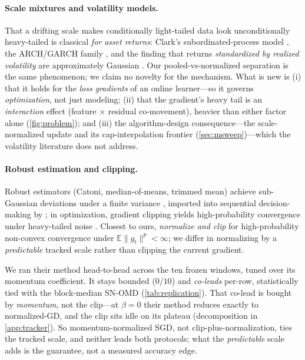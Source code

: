 \documentclass{article}
\newcommand{\norm}[1]{\lVert #1 \rVert}
\newcommand{\gt}{g_t}
\begin{document}
\paragraph{Scale mixtures and volatility models.} That a drifting scale makes
conditionally light-tailed data look unconditionally heavy-tailed is classical \emph{for
asset returns}: Clark's subordinated-process model \citep{clark1973}, the ARCH/GARCH family
\citep{engle1982,bollerslev1986}, and the finding that returns \emph{standardized by
realized volatility} are approximately Gaussian \citep{andersen2001}. Our
pooled-vs-normalized separation is the same phenomenon; we claim no novelty for the
mechanism. What is new is (i) that it holds for the \emph{loss gradients} of an online
learner---so it governs \emph{optimization}, not just modeling; (ii) that the gradient's
heavy tail is an \emph{interaction} effect (feature $\times$ residual co-movement), heavier
than either factor alone (\cref{fig:problem}); and (iii) the algorithm-design
consequence---the scale-normalized update and its cap-interpolation frontier
(\cref{sec:msweep})---which the volatility literature does not address.

\paragraph{Robust estimation and clipping.} Robust estimators (Catoni, median-of-means,
trimmed mean) achieve sub-Gaussian deviations under a finite variance
\citep{catoni2012,devroye2016,lugosi2019}, imported into sequential decision-making by
\citet{bubeck2013}; in optimization, gradient clipping yields high-probability convergence
under heavy-tailed noise \citep{zhang2020clip,gorbunov2020,nguyen2023}. Closest to ours,
\citet{cutkoskymehta2021} \emph{normalize and clip} for high-probability non-convex
convergence under $\mathbb{E}\norm{\gt}^p\!<\!\infty$; we differ in normalizing by a
\emph{predictable} tracked scale rather than clipping the current gradient.

We ran their method head-to-head across the ten frozen windows, tuned over its momentum
coefficient. It stays bounded ($0/10$) and \emph{co-leads} per-row, statistically tied with the
block-median SN-OMD (\cref{tab:replication}). That co-lead is bought by \emph{momentum}, not the
clip---at $\beta{=}0$ their method reduces exactly to normalized-GD, and the clip sits idle on
its plateau (decomposition in \cref{app:tracker}). So momentum-normalized SGD, not
clip-plus-normalization, ties the tracked scale, and neither leads both protocols; what the
\emph{predictable} scale adds is the guarantee, not a measured accuracy edge.
\end{document}
